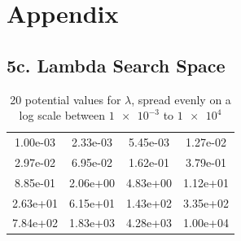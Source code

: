 \documentclass[twocolumn]{article}
\begin{document}
\newpage
\printbibliography[
    heading=bibintoc,
    title={References}
]

\newpage
\onecolumn
\section{Appendix}
\subsection{5c. Lambda Search Space}
\begin{table}[H]
    \centering
    \begin{tabular}{cccc}
        1.00e-03& 2.33e-03& 5.45e-03& 1.27e-02 \\
        2.97e-02& 6.95e-02& 1.62e-01& 3.79e-01 \\
        8.85e-01& 2.06e+00& 4.83e+00& 1.12e+01 \\
        2.63e+01& 6.15e+01& 1.43e+02& 3.35e+02 \\
        7.84e+02& 1.83e+03& 4.28e+03& 1.00e+04 \\
    \end{tabular}
    \caption{20 potential values for $\lambda$, spread evenly on a log scale between $\num{1e-3}$ to $\num{1e4}$}
    \label{tab:lambda-search-space}
\end{table}
\end{document}
